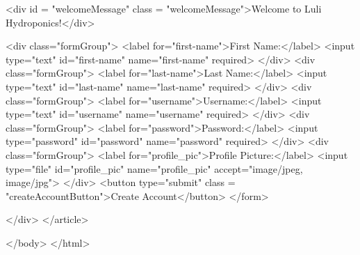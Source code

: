 \documentclass[12pt]{article} %
\begin{document}
\begin{htmlcode}[caption={Create Account HTML}]
            <div id = "welcomeMessage" class = "welcomeMessage">Welcome to Luli Hydroponics!</div>

            <div class="formGroup">  
               <label for="first-name">First Name:</label>
               <input type="text" id="first-name" name="first-name" required>
            </div>
            <div class="formGroup">
               <label for="last-name">Last Name:</label>
               <input type="text" id="last-name" name="last-name" required>
            </div>
            <div class="formGroup">
               <label for="username">Username:</label>
               <input type="text" id="username" name="username" required>
            </div>
            <div class="formGroup">
               <label for="password">Password:</label>
               <input type="password" id="password" name="password" required>
            </div>
            <div class="formGroup">  
               <label for="profile_pic">Profile Picture:</label>
               <input type="file" id="profile_pic" name="profile_pic" accept="image/jpeg, image/jpg">
            </div>
            <button type="submit" class = "createAccountButton">Create Account</button>
        </form>       

      </div>
</article> 
   
</body>
</html>
\end{htmlcode}

\pagebreak
\end{document}
